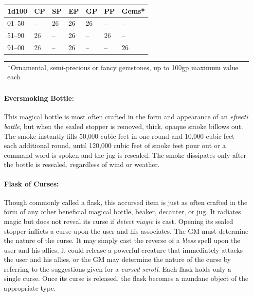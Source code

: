 \begin{multicols}{2}
\noindent \begin{tabular}{|p{}|p{}|p{}|p{}|p{}|p{}|p{}|}
\hline
1d100	& CP	& SP	& EP	& GP	& PP	& Gems* \\
\hline\hline
\rowcolor[gray]{0.9}01--50	& --	& 26	& 26	& 26	& --	& -- \\
51--90	& 26	& --	& 26	& --	& 26	& -- \\
\rowcolor[gray]{0.9}91--00	& 26	& --	& 26	& --	& --	& 26 \\
\hline
\end{tabular}
\noindent\begin{tabular}{p{}}
*Ornamental, semi-precious or fancy gemstones, up to 100gp maximum value each \\
\end{tabular}\vspace{.5em}

\paragraph{Eversmoking Bottle:} This magical bottle is most often crafted in the form and appearance of an \textit{efreeti bottle}, but when the sealed stopper is removed, thick, opaque smoke billows out.  The smoke instantly fills 50,000 cubic feet in one round and 10,000 cubic feet each additional round, until 120,000 cubic feet of smoke feet pour out or a command word is spoken and the jug is resealed.  The smoke dissipates only after the bottle is resealed, regardless of wind or weather.

\paragraph{Flask of Curses:} Though commonly called a flask, this accursed item is just as often crafted in the form of any other beneficial magical bottle, beaker, decanter, or jug.  It radiates magic but does not reveal its curse if \textit{detect magic} is cast.  Opening its sealed stopper inflicts a curse upon the user and his associates.  The GM must determine the nature of the curse.  It may simply cast the reverse of a \textit{bless} spell upon the user and his allies, it could release a powerful creature that immediately attacks the user and his allies, or the GM may determine the nature of the curse by referring to the suggestions given for a \textit{cursed scroll}.  Each flask holds only a single curse.  Once its curse is released, the flask becomes a mundane object of the appropriate type.


\end{multicols}

